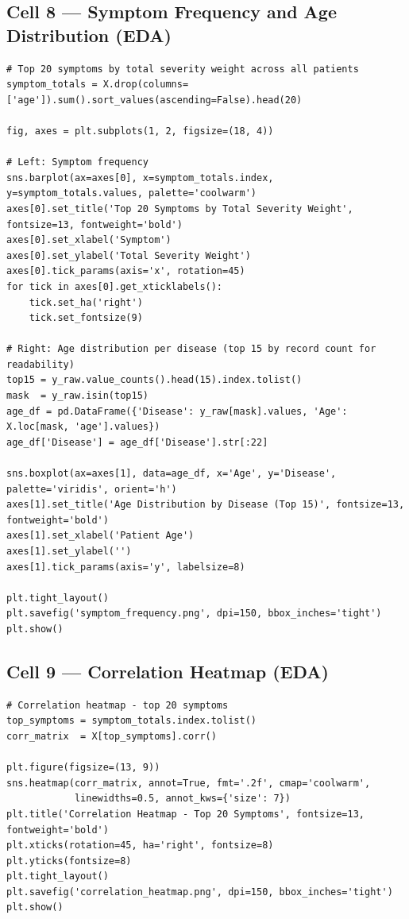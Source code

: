 \documentclass[12pt,a4paper]{article}
\begin{document}
\subsection{Cell 8 --- Symptom Frequency and Age Distribution (EDA)}

\begin{lstlisting}[caption=Cell 8: Top 20 Symptoms and Age Distribution by Disease]
# Top 20 symptoms by total severity weight across all patients
symptom_totals = X.drop(columns=['age']).sum().sort_values(ascending=False).head(20)

fig, axes = plt.subplots(1, 2, figsize=(18, 4))

# Left: Symptom frequency
sns.barplot(ax=axes[0], x=symptom_totals.index, y=symptom_totals.values, palette='coolwarm')
axes[0].set_title('Top 20 Symptoms by Total Severity Weight', fontsize=13, fontweight='bold')
axes[0].set_xlabel('Symptom')
axes[0].set_ylabel('Total Severity Weight')
axes[0].tick_params(axis='x', rotation=45)
for tick in axes[0].get_xticklabels():
    tick.set_ha('right')
    tick.set_fontsize(9)

# Right: Age distribution per disease (top 15 by record count for readability)
top15 = y_raw.value_counts().head(15).index.tolist()
mask  = y_raw.isin(top15)
age_df = pd.DataFrame({'Disease': y_raw[mask].values, 'Age': X.loc[mask, 'age'].values})
age_df['Disease'] = age_df['Disease'].str[:22]

sns.boxplot(ax=axes[1], data=age_df, x='Age', y='Disease', palette='viridis', orient='h')
axes[1].set_title('Age Distribution by Disease (Top 15)', fontsize=13, fontweight='bold')
axes[1].set_xlabel('Patient Age')
axes[1].set_ylabel('')
axes[1].tick_params(axis='y', labelsize=8)

plt.tight_layout()
plt.savefig('symptom_frequency.png', dpi=150, bbox_inches='tight')
plt.show()
\end{lstlisting}

\subsection{Cell 9 --- Correlation Heatmap (EDA)}

\begin{lstlisting}[caption=Cell 9: Correlation Heatmap of Top 20 Symptoms]
# Correlation heatmap - top 20 symptoms
top_symptoms = symptom_totals.index.tolist()
corr_matrix  = X[top_symptoms].corr()

plt.figure(figsize=(13, 9))
sns.heatmap(corr_matrix, annot=True, fmt='.2f', cmap='coolwarm',
            linewidths=0.5, annot_kws={'size': 7})
plt.title('Correlation Heatmap - Top 20 Symptoms', fontsize=13, fontweight='bold')
plt.xticks(rotation=45, ha='right', fontsize=8)
plt.yticks(fontsize=8)
plt.tight_layout()
plt.savefig('correlation_heatmap.png', dpi=150, bbox_inches='tight')
plt.show()
\end{lstlisting}
\end{document}
